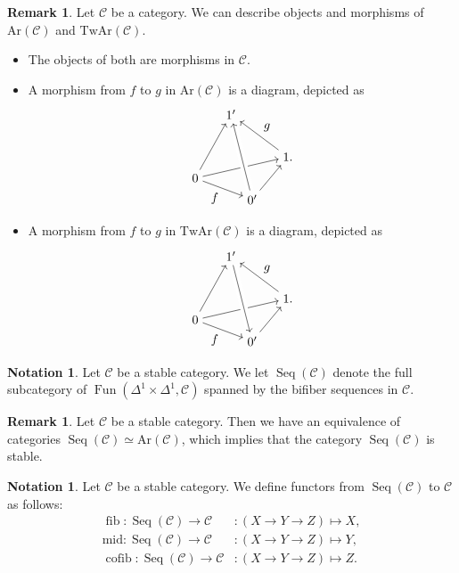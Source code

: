 \documentclass[a4paper,dvipdfmx,11pt,reqno]{amsart}
\DeclareMathOperator{\fib}{fib}
\DeclareMathOperator{\cofib}{cofib}
\renewcommand{\mid}{\mathrm{mid}}
\DeclareMathOperator{\Fun}{Fun}
\newcommand{\C}{\mathcal{C}}
\DeclareMathOperator{\Seq}{Seq}
\newcommand{\Ar}{\mathrm{Ar}}
\newcommand{\TwAr}{\mathrm{TwAr}}
\theoremstyle{definition}
\newtheorem{notation}[theorem]{Notation}
\newtheorem{remark}[theorem]{Remark}
\begin{document}
\begin{remark} \label{Ber.rem.3.2}
  Let $\C$ be a category.
  We can describe objects and morphisms of $\Ar(\C)$ and $\TwAr(\C)$.
  \begin{itemize}
    \item The objects of both are morphisms in $\C$.
    \item A morphism from $f$ to $g$ in $\Ar(\C)$ is a diagram, depicted as 
    \[\begin{tikzpicture}[auto]
      \node (0) at (0,0) {$0$};
      \node (1) at (1.6,-0.6) {$0'$};
      \node (2) at (2.6,0.6) {$1.$};
      \node (3) at (1,1.8) {$1'$};
      \draw[->] (0) -- node[swap] {$f$} (1);
      \draw[->] (0) -- node {} (2);
      \draw[->] (0) -- node {} (3);
      \draw[->] (1) -- node {} (2);
      \draw[-, line width=6pt,draw=white] (1) -- node {} (3);
      \draw[->] (1) -- node {} (3);
      \draw[->] (2) -- node[swap] {$g$} (3);
    \end{tikzpicture}\]
    \item A morphism from $f$ to $g$ in $\TwAr(\C)$ is a diagram, depicted as 
    \[\begin{tikzpicture}[auto]
      \node (0) at (0,0) {$0$};
      \node (1) at (1.6,-0.6) {$0'$};
      \node (2) at (2.6,0.6) {$1.$};
      \node (3) at (1,1.8) {$1'$};
      \draw[->] (0) -- node[swap] {$f$} (1);
      \draw[->] (0) -- node {} (2);
      \draw[->] (0) -- node {} (3);
      \draw[->] (1) -- node {} (2);
      \draw[-, line width=6pt,draw=white] (1) -- node {} (3);
      \draw[->] (3) -- node {} (1);
      \draw[->] (2) -- node[swap] {$g$} (3);
    \end{tikzpicture}\]
  \end{itemize}
\end{remark}

\begin{notation} \label{Ber.p49}
  Let $\C$ be a stable category.
  We let $\Seq(\C)$ denote the full subcategory of $\Fun(\Delta^1 \times \Delta^1,\C)$ spanned by the bifiber sequences in $\C$.
\end{notation}

\begin{remark}
  Let $\C$ be a stable category.
  Then we have an equivalence of categories $\Seq(\C) \simeq \Ar(\C)$, which implies that the category $\Seq(\C)$ is stable.
\end{remark}

\begin{notation}
  Let $\C$ be a stable category.
  We define functors from $\Seq(\C)$ to $\C$ as follows:
  \begin{align*}
    \fib   : \Seq(\C) \to \C &: (X \to Y \to Z) \mapsto X, \\
    \mid   : \Seq(\C) \to \C &: (X \to Y \to Z) \mapsto Y, \\
    \cofib : \Seq(\C) \to \C &: (X \to Y \to Z) \mapsto Z.
  \end{align*}
\end{notation}
\end{document}
